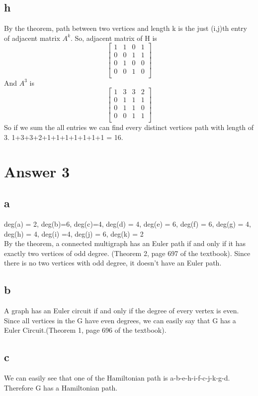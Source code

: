 \documentclass[11pt]{article}
\begin{document}
\subsection*{h}
By the theorem, path between two vertices and length k is the just (i,j)th entry of adjacent matrix $A^k$. So, adjacent matrix of H is 
\[
\begin{bmatrix}
    1 & 1 & 0 & 1  \\
    0 & 0 & 1 & 1  \\
    0 & 1 & 0 & 0  \\
    0 & 0 & 1 & 0  \\
    
\end{bmatrix}
\]
And $A^3$ is
\[
\begin{bmatrix}
    1 & 3 & 3 & 2  \\
    0 & 1 & 1 & 1  \\
    0 & 1 & 1 & 0  \\
    0 & 0 & 1 & 1  \\
    
\end{bmatrix}
\] 
So if we sum the all entries we can find every distinct vertices path with length of 3. 1+3+3+2+1+1+1+1+1+1+1 = 16.
\section*{Answer 3}
\subsection*{a}
deg(a) = 2, deg(b)=6, deg(c)=4, deg(d) = 4, deg(e) = 6, deg(f) = 6, deg(g) = 4, deg(h) = 4, deg(i) =4, deg(j) = 6, deg(k) = 2\\
By the theorem, a connected multigraph has an Euler path if and only if it has exactly
two vertices of odd degree. (Theorem 2, page 697 of the textbook). Since there is no two vertices with odd degree, it doesn't have an Euler path.
\subsection*{b}
A graph has an Euler circuit if and only if the degree of every vertex is even. Since all vertices in the G have even degrees, we can easily say that G has a Euler Circuit.(Theorem 1, page 696 of the textbook). 
\subsection*{c}
We can easily see that one of the Hamiltonian path is a-b-e-h-i-f-c-j-k-g-d. Therefore G has a Hamiltonian path.
\end{document}
